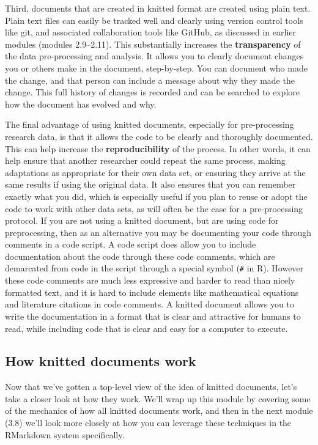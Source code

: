 \documentclass[]{tufte-book}
\begin{document}
Third, documents that are created in knitted format are created using plain
text. Plain text files can easily be tracked well and clearly using version
control tools like git, and associated collaboration tools like GitHub, as
discussed in earlier modules (modules 2.9--2.11). This substantially increases the \textbf{transparency}
of the data pre-processing and analysis. It allows you to clearly document
changes you or others make in the document, step-by-step. You can document who
made the change, and that person can include a message about why they made the
change. This full history of changes is recorded and can be searched to explore
how the document has evolved and why.

The final advantage of using knitted documents, especially for pre-processing
research data, is that it allows the code to be clearly and thoroughly
documented. This can help increase the \textbf{reproducibility} of the process. In
other words, it can help ensure that another researcher could repeat the same
process, making adaptations as appropriate for their own data set, or ensuring
they arrive at the same results if using the original data. It also ensures that
you can remember exactly what you did, which is especially useful if you plan to
reuse or adopt the code to work with other data sets, as will often be the case
for a pre-processing protocol. If you are not using a knitted document, but are
using code for preprocessing, then as an alternative you may be documenting your
code through comments in a code script. A code script does allow you to include
documentation about the code through these code comments, which are demarcated
from code in the script through a special symbol (\texttt{\#} in R). However these code
comments are much less expressive and harder to read than nicely formatted text,
and it is hard to include elements like mathematical equations and literature
citations in code comments. A knitted document allows you to write the
documentation in a format that is clear and attractive for humans to read, while
including code that is clear and easy for a computer to execute.

\subsection{How knitted documents work}\label{how-knitted-documents-work}

Now that we've gotten a top-level view of the idea of knitted documents, let's take a
closer look at how they work. We'll wrap up this module by covering some of
the mechanics of how all knitted documents work, and then in the next module (3.8)
we'll look more closely at how you can leverage these techniques in the
RMarkdown system specifically.
\end{document}
